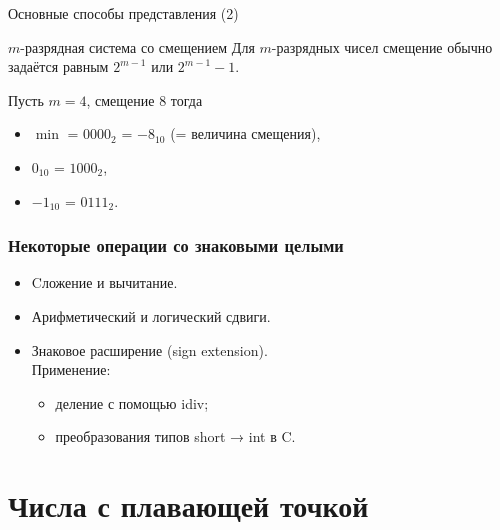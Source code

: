 \begin{frame}{Основные способы представления (2)}
\begin{block}{$m$-разрядная система со смещением}
Для $m$-разрядных чисел смещение обычно задаётся равным $2^{m-1}$
или $2^{m-1} - 1$.

\pause Пусть $m=4$, смещение $8$ тогда
    \begin{itemize}
        \item  $\min$ = \pause $0000_2$ \pause = $-8_{10}$ (= величина смещения),
        \pause\item  $0_{10}$ = \pause $1000_2$,
        \pause\item  $-1_{10}$ = \pause $0111_2$.
    \end{itemize}
\end{block}
\end{frame}


\begin{frame}
\frametitle{Некоторые операции со знаковыми целыми}
\begin{itemize}
    \item Cложение и вычитание.
    \pause\item Арифметический и логический сдвиги.
    \pause\item Знаковое расширение (sign extension). \\
        \pause Применение:
        \begin{itemize}
            \pause\item деление с помощью idiv;
            \pause\item преобразования типов short → int в C.
        \end{itemize}
\end{itemize}
\end{frame}


\section{Числа с плавающей точкой}

